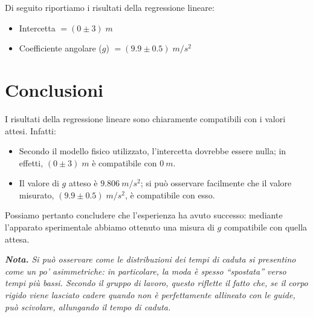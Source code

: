 \documentclass{article}
\begin{document}
Di seguito riportiamo i risultati della regressione lineare:
\begin{itemize}
    \item Intercetta $=(0\pm3)\;\unit{m}$
    \item Coefficiente angolare ($g$) $=(9.9\pm0.5)\;\unit{m \per s^2}$
\end{itemize}

\section{Conclusioni}
I risultati della regressione lineare sono chiaramente compatibili
con i valori attesi. Infatti:
\begin{itemize}
    \item Secondo il modello fisico utilizzato, l'intercetta dovrebbe essere nulla;
          in effetti, $(0\pm3)\;\unit{m}$ è compatibile con $\qty{0}{m}$.
    \item Il valore di $g$ atteso è $\qty{9.806}{m\per s^2}$; si può osservare
          facilmente che il valore misurato, $(9.9\pm0.5)\;\unit{m \per s^2}$, è
          compatibile con esso.
\end{itemize}

Possiamo pertanto concludere che l'esperienza ha avuto successo: mediante l'apparato
sperimentale abbiamo ottenuto una misura di $g$ compatibile con quella attesa.

\emph{\textbf{Nota.}
    Si può osservare come le distribuzioni dei tempi di caduta si
    presentino come un po' asimmetriche: in particolare, la moda è
    spesso “spostata” verso tempi più bassi. Secondo il gruppo di lavoro,
    questo riflette il fatto che, se il corpo rigido viene lasciato cadere
    quando non è perfettamente allineato con le guide, può scivolare,
    allungando il tempo di caduta.
}
\end{document}
